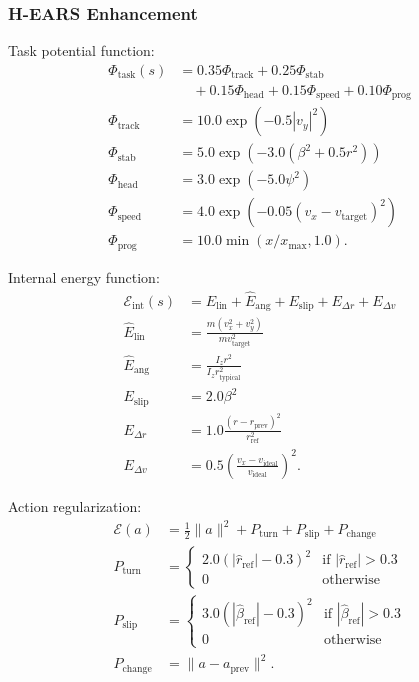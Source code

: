 \documentclass[journal]{IEEEtran}
\begin{document}
	\subsubsection{H-EARS Enhancement}
	
	Task potential function:
	\begin{equation}
		\begin{aligned}
			\Phi_{\text{task}}(s) &= 0.35\Phi_{\text{track}} + 0.25\Phi_{\text{stab}} \\
			&\quad + 0.15\Phi_{\text{head}} + 0.15\Phi_{\text{speed}} + 0.10\Phi_{\text{prog}} \\
			\Phi_{\text{track}} &= 10.0\exp(-0.5|v_y|^2) \\
			\Phi_{\text{stab}} &= 5.0\exp(-3.0(\beta^2 + 0.5r^2)) \\
			\Phi_{\text{head}} &= 3.0\exp(-5.0\psi^2) \\
			\Phi_{\text{speed}} &= 4.0\exp(-0.05(v_x-v_{\text{target}})^2) \\
			\Phi_{\text{prog}} &= 10.0\min(x/x_{\text{max}}, 1.0).
		\end{aligned}
	\end{equation}
	
	Internal energy function:
	\begin{equation}
		\begin{aligned}
			\mathcal{E}_{\text{int}}(s) &= \hat{E}_{\text{lin}} + \hat{E}_{\text{ang}} + E_{\text{slip}} + E_{\Delta r} + E_{\Delta v} \\
			\hat{E}_{\text{lin}} &= \frac{m(v_x^2+v_y^2)}{mv_{\text{target}}^2} \\
			\hat{E}_{\text{ang}} &= \frac{I_zr^2}{I_zr_{\text{typical}}^2} \\
			E_{\text{slip}} &= 2.0\beta^2 \\
			E_{\Delta r} &= 1.0\frac{(r-r_{\text{prev}})^2}{r_{\text{ref}}^2} \\
			E_{\Delta v} &= 0.5\left(\frac{v_x-v_{\text{ideal}}}{v_{\text{ideal}}}\right)^2.
		\end{aligned}
	\end{equation}
	
	Action regularization:
	\begin{equation}
		\begin{aligned}
			\mathcal{E}(a) &= \frac{1}{2}\|a\|^2 + P_{\text{turn}} + P_{\text{slip}} + P_{\text{change}} \\
			P_{\text{turn}} &= 
			\begin{cases}
				2.0(|\hat{r}_{\text{ref}}|-0.3)^2 & \text{if } |\hat{r}_{\text{ref}}| > 0.3 \\
				0 & \text{otherwise}
			\end{cases} \\
			P_{\text{slip}} &= 
			\begin{cases}
				3.0(|\hat{\beta}_{\text{ref}}|-0.3)^2 & \text{if } |\hat{\beta}_{\text{ref}}| > 0.3 \\
				0 & \text{otherwise}
			\end{cases} \\
			P_{\text{change}} &= \|a - a_{\text{prev}}\|^2.
		\end{aligned}
	\end{equation}
	
\end{document}
